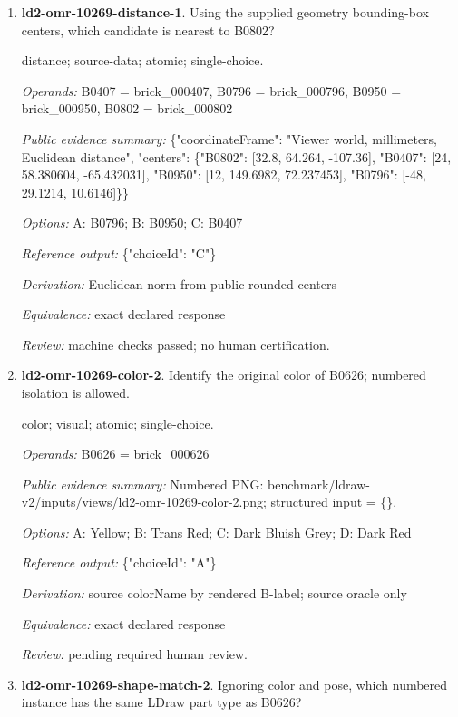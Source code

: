 \begin{enumerate}
\item \textbf{ld2-omr-10269-distance-1}. Using the supplied geometry bounding-box centers, which candidate is nearest to B0802?
\par{\small distance; source-data; atomic; single-choice.\par\textit{Operands:} B0407 = brick\_000407, B0796 = brick\_000796, B0950 = brick\_000950, B0802 = brick\_000802\par\textit{Public evidence summary:} \{"coordinateFrame": "Viewer world, millimeters, Euclidean distance", "centers": \{"B0802": [32.8, 64.264, -107.36], "B0407": [24, 58.380604, -65.432031], "B0950": [12, 149.6982, 72.237453], "B0796": [-48, 29.1214, 10.6146]\}\}\par\textit{Options:} A: B0796; B: B0950; C: B0407\par\textit{Reference output:} \{"choiceId": "C"\}\par\textit{Derivation:} Euclidean norm from public rounded centers\par\textit{Equivalence:} exact declared response\par\textit{Review:} machine checks passed; no human certification.}
\item \textbf{ld2-omr-10269-color-2}. Identify the original color of B0626; numbered isolation is allowed.
\par{\small color; visual; atomic; single-choice.\par\textit{Operands:} B0626 = brick\_000626\par\textit{Public evidence summary:} Numbered PNG: benchmark/ldraw-v2/inputs/views/ld2-omr-10269-color-2.png; structured input = \{\}.\par\textit{Options:} A: Yellow; B: Trans Red; C: Dark Bluish Grey; D: Dark Red\par\textit{Reference output:} \{"choiceId": "A"\}\par\textit{Derivation:} source colorName by rendered B-label; source oracle only\par\textit{Equivalence:} exact declared response\par\textit{Review:} pending required human review.}
\item \textbf{ld2-omr-10269-shape-match-2}. Ignoring color and pose, which numbered instance has the same LDraw part type as B0626?

\end{enumerate}
